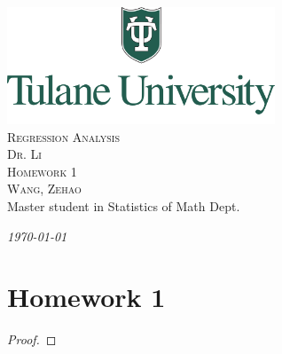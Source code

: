 \documentclass[12pt]{article}
\newcommand{\CN}{Regression Analysis}
\newcommand{\Ti}{Homework 1}
\newcommand{\Pf}{Dr. Li}
\newcommand{\FN}{Zehao}
\newcommand{\LN}{Wang}
\begin{document}
\begin{titlepage}
    \begin{center}    
    \includegraphics[width=0.6\textwidth]{Tulane.png}\\[1cm]    
    
    \textsc{\Huge \CN}\\[0.5cm]
    \textsc{\large \Pf}\\[1.0cm]
    
    \textsc{\LARGE \Ti}\\[0.5cm]
    \textsc{\large \LN, \FN}\\
    {Master student in Statistics of Math Dept.}
    
    
    \vfill
    
    {\Large \emph{\today}}
    
    \end{center}
\end{titlepage}
    
    \setcounter{section}{1}    

    \section*{\Ti}

    \begin{exercise}
        
    \end{exercise}

    \begin{proof}
        
    \end{proof}
\end{document}
